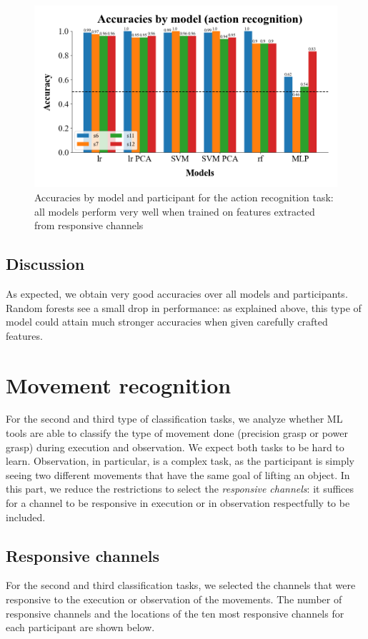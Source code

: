 \documentclass[10pt,conference,compsocconf]{IEEEtran}
\begin{document}
\begin{figure}[h!]
  \center
  \includegraphics[width=\linewidth]{../figures/accuracies_across_part_ExObs.png}
  \caption{Accuracies by model and participant for the action recognition task: all models perform very well when trained on features extracted from responsive channels}
\end{figure}
\FloatBarrier

\subsection{Discussion}
As expected, we obtain very good accuracies over all models and participants. Random forests see a small drop in performance: as explained above, this type of model could attain much stronger accuracies when given carefully crafted features.

\section{Movement recognition}
\label{sec:objectrecognition}
For the second and third type of classification tasks, we analyze whether ML tools are able to classify the type of movement done (precision grasp or power grasp) during execution and observation. We expect both tasks to be hard to learn. Observation, in particular, is a complex task, as the participant is simply seeing two different movements that have the same goal of lifting an object. In this part, we reduce the restrictions to select the \textit{responsive channels}: it suffices for a channel to be responsive in execution or in observation respectfully to be included.

\subsection{Responsive channels}
For the second and third classification tasks, we selected the channels that were responsive to the execution or observation of the movements. The number of responsive channels and the locations of the ten most responsive channels for each participant are shown below.
\end{document}
